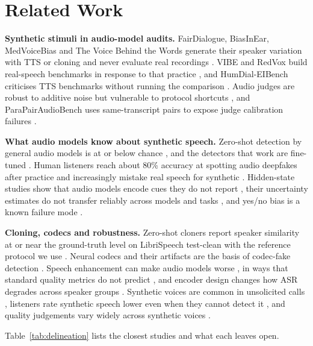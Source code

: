 \section{Related Work}
\label{sec:related}

\textbf{Synthetic stimuli in audio-model audits.} FairDialogue, BiasInEar, MedVoiceBias and The Voice Behind the Words generate their speaker variation with TTS or cloning and never evaluate real recordings \citep{a2510_02352,a2602_01030,a2511_06592,a2603_16941}. VIBE and RedVox build real-speech benchmarks in response to that practice \citep{a2604_17248,a2606_26968}, and HumDial-EIBench criticises TTS benchmarks without running the comparison \citep{a2604_11594}. Audio judges are robust to additive noise \citep{a2507_12705} but vulnerable to protocol shortcuts \citep{a2607_13477}, and ParaPairAudioBench uses same-transcript pairs to expose judge calibration failures \citep{a2606_24648}.

\textbf{What audio models know about synthetic speech.} Zero-shot detection by general audio models is at or below chance \citep{a2505_11079,a2512_10652,a2601_00777}, and the detectors that work are fine-tuned \citep{a2603_10725}. Human listeners reach about 80\% accuracy at spotting audio deepfakes after practice \citep{mueller2021} and increasingly mistake real speech for synthetic \citep{a2605_26136}. Hidden-state studies show that audio models encode cues they do not report \citep{a2605_13737,a2609_00727}, their uncertainty estimates do not transfer reliably across models and tasks \citep{a2604_25591}, and yes/no bias is a known failure mode \citep{a2604_19300}.

\textbf{Cloning, codecs and robustness.} Zero-shot cloners report speaker similarity at or near the ground-truth level on LibriSpeech test-clean with the reference protocol we use \citep{a2410_06885,a2412_10117,a2605_30748}. Neural codecs and their artifacts are the basis of codec-fake detection \citep{a2210_13438,a2501_08238}. Speech enhancement can make audio models worse \citep{a2601_10384}, in ways that standard quality metrics do not predict \citep{a2608_30348}, and encoder design changes how ASR degrades across speaker groups \citep{a2604_21276}. Synthetic voices are common in unsolicited calls \citep{a2609_11137}, listeners rate synthetic speech lower even when they cannot detect it \citep{a2605_28064}, and quality judgements vary widely across synthetic voices \citep{cambre2020}.

Table~\ref{tab:delineation} lists the closest studies and what each leaves open.

